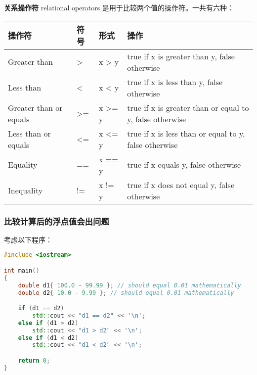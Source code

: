 \documentclass[../../LearnCpp.tex]{subfiles}
\begin{document}

\textbf{关系操作符} relational operators 是用于比较两个值的操作符。一共有六种：

\begin{center}
  \begin{tiny}
    \begin{tabularx}{ 1\textwidth}{
        | >{\raggedright\arraybackslash}X
        | >{\raggedright\arraybackslash}X
        | >{\raggedright\arraybackslash}X
        | >{\raggedright\arraybackslash}X |
      }
      \hline
      操作符                    & 符号 & 形式     & 操作                                                       \\
      \hline
      Greater than           & >  & x > y  & true if x is greater than y, false otherwise             \\
      Less than              & <  & x < y  & true if x is less than y, false otherwise                \\
      Greater than or equals & >= & x >= y & true if x is greater than or equal to y, false otherwise \\
      Less than or equals    & <= & x <= y & true if x is less than or equal to y, false otherwise    \\
      Equality               & == & x == y & true if x equals y, false otherwise                      \\
      Inequality             & != & x != y & true if x does not equal y, false otherwise              \\
      \hline
    \end{tabularx}
  \end{tiny}
\end{center}

\subsubsection*{比较计算后的浮点值会出问题}

考虑以下程序：

\begin{lstlisting}[language=C++]
#include <iostream>

int main()
{
    double d1{ 100.0 - 99.99 }; // should equal 0.01 mathematically
    double d2{ 10.0 - 9.99 }; // should equal 0.01 mathematically

    if (d1 == d2)
        std::cout << "d1 == d2" << '\n';
    else if (d1 > d2)
        std::cout << "d1 > d2" << '\n';
    else if (d1 < d2)
        std::cout << "d1 < d2" << '\n';

    return 0;
}
\end{lstlisting}
\end{document}
